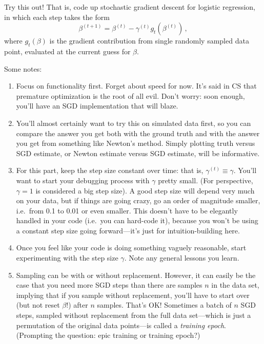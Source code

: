 \documentclass{mynotes}
\begin{document}
\begin{enumerate}[(A)]
Try this out!  That is, code up stochastic gradient descent for logistic regression, in which each step takes the form
$$
\beta^{(t+1)} = \beta^{(t)} - \gamma^{(t)} g_t (\beta^{(t)}) \, ,
$$
where $g_t (\beta)$ is the gradient contribution from single randomly sampled data point, evaluated at the current guess for $\beta$.

Some notes:
\begin{enumerate}[1.]
\item Focus on functionality first.  Forget about speed for now.  It's said in CS that premature optimization is the root of all evil.  Don't worry: soon enough, you'll have an SGD implementation that will blaze.
\item You'll almost certainly want to try this on simulated data first, so you can compare the answer you get both with the ground truth and with the answer you get from something like Newton's method.  Simply plotting truth versus SGD estimate, or Newton estimate versus SGD estimate, will be informative.
\item For this part,  keep the step size constant over time: that is, $\gamma^{(t)} \equiv \gamma$.  You'll want to start your debugging process with $\gamma$ pretty small.  (For perspective, $\gamma = 1$ is considered a big step size).  A good step size will depend very much on your data, but if things are going crazy, go an order of magnitude smaller, i.e.~from 0.1 to 0.01 or even smaller.  This doesn't have to be elegantly handled in your code (i.e.~you can hard-code it), because you won't be using a constant step size going forward---it's just for intuition-building here.
\item Once you feel like your code is doing something vaguely reasonable, start experimenting with the step size $\gamma$.  Note any general lessons you learn.
\item Sampling can be with or without replacement.  However, it can easily be the case that you need more SGD steps than there are samples $n$ in the data set, implying that if you sample without replacement, you'll have to start over (but not reset $\beta$!) after $n$ samples.   That's OK!  Sometimes a batch of $n$ SGD steps, sampled without replacement from the full data set---which is just a permutation of the original data points---is called a \textit{training epoch}.  (Prompting the question: epic training or training epoch?)
\end{enumerate}



\end{enumerate}
\end{document}
